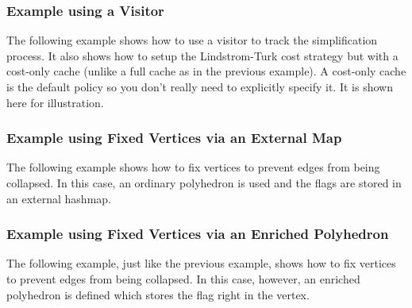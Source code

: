 \subsubsection{Example using a Visitor}

The following example shows how to use a visitor to track the simplification process. 
It also shows how to setup the Lindstrom-Turk cost strategy but with a cost-only 
cache (unlike a full cache as in the previous example). A cost-only cache is
the default policy so you don't really need to explicitly specify it. It is shown here
for illustration.



\subsubsection{Example using Fixed Vertices via an External Map}

The following example shows how to fix vertices to prevent edges from being collapsed. 
In this case, an ordinary polyhedron is used and the flags are stored 
in an external hashmap.


\subsubsection{Example using Fixed Vertices via an Enriched Polyhedron}

The following example, just like the previous example, shows how to fix vertices to 
prevent edges from being collapsed. In this case, however, an enriched polyhedron 
is defined which stores the flag right in the vertex.




